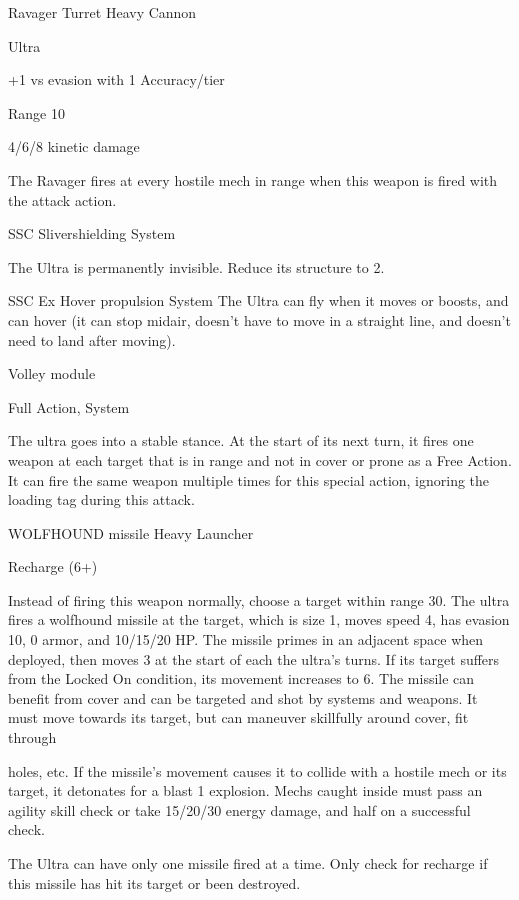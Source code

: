 Ravager Turret  
Heavy Cannon
 
Ultra
 
+1 vs evasion with 1 Accuracy/tier
 
Range 10
 
4/6/8 kinetic damage
 
The Ravager fires at every hostile mech in range when this weapon is fired with the attack action.
 

SSC Slivershielding  
System
 
The Ultra is permanently invisible. Reduce its structure to 2.
 

SSC Ex Hover propulsion  
System  
The Ultra can fly when it moves or boosts, and can hover (it can stop midair, doesn’t have to  
move in a straight line, and doesn’t need to land after moving).
 

Volley module
 
Full Action, System
 
The ultra goes into a stable stance. At the start of its next turn, it fires one weapon at each target  
that is in range and not in cover or prone as a Free Action. It can fire the same weapon multiple  
times for this special action, ignoring the loading tag during this attack.
 

WOLFHOUND missile  
Heavy Launcher
 
Recharge (6+)
 
Instead of firing this weapon normally, choose a target within range 30. The ultra fires a  
wolfhound missile at the target, which is size 1, moves speed 4, has evasion 10, 0 armor, and  
10/15/20 HP. The missile primes in an adjacent space when deployed, then moves 3 at the start  
of each the ultra’s turns. If its target suffers from the Locked On condition, its movement  
increases to 6. The missile can benefit from cover and can be targeted and shot by systems and  
weapons. It must move towards its target, but can maneuver skillfully around cover, fit through  

                                                                                                            


holes, etc. If the missile’s movement causes it to collide with a hostile mech or its target, it  
detonates for a blast 1 explosion. Mechs caught inside must pass an agility skill check or take  
15/20/30 energy damage, and half on a successful check.
 

The Ultra can have only one missile fired at a time. Only check for recharge if this missile has hit  
its target or been destroyed.
 
